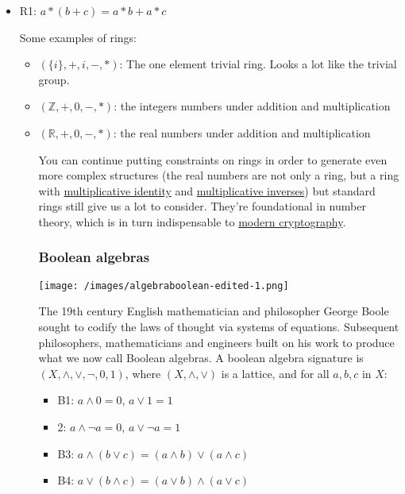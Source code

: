 \documentclass{article}
\begin{document}
\begin{itemize}
{\begin{itemize}
\item{R1: $ a \ast (b + c) = a \ast b + a \ast c$}

Some examples of rings:

\begin{itemize}
\item{$ (\{i\}, +, i, -, \ast)$: The one element trivial ring. Looks a lot like the trivial group.}
\item{$ (\mathbb{Z}, +, 0, -, \ast)$: the integers numbers under addition and multiplication}
\item{$ (\mathbb{R}, +, 0, -, \ast)$: the real numbers under addition and multiplication}

You can continue putting constraints on rings in order to generate even more complex structures (the real numbers are not only a ring, but a ring with \href{https://mathworld.wolfram.com/MultiplicativeIdentity.html}{multiplicative identity} and \href{https://mathworld.wolfram.com/MultiplicativeInverse.html}{multiplicative inverses}) but standard rings still give us a lot to consider. They're foundational in number theory, which is in turn indispensable to \href{https://www.math.utk.edu/~finotti/papers/grad.pdf}{modern cryptography}.

\subsubsection{Boolean algebras}

\texttt{[image: /images/algebraboolean-edited-1.png]}

The 19th century English mathematician and philosopher George Boole sought to codify the laws of thought via systems of equations. Subsequent philosophers, mathematicians and engineers built on his work to produce what we now call Boolean algebras. A boolean algebra signature is $ (X, \land, \lor, \neg, 0, 1)$, where $ (X, \land, \lor)$ is a lattice, and for all $ a, b, c$ in $ X$:

\begin{itemize}
\item{B1: $ a \land 0 = 0$, $ a \lor 1 = 1$}
\item{2: $ a \land \neg a = 0$, $ a \lor \neg a = 1$}
\item{B3: $ a \land (b \lor c) = (a \land b) \lor (a \land c)$}
\item{B4: $ a \lor (b \land c) = (a \lor b) \land (a \lor c)$}
\end{itemize}


\end{itemize}
\end{itemize}}
\end{itemize}
\end{document}
